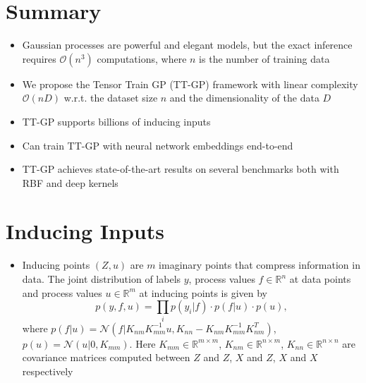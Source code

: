 \documentclass[a0,portrait]{a0poster}
\newcommand{\Knn}{K_{nn}}
\newcommand{\Knm}{K_{nm}}
\newcommand{\Kmm}{K_{mm}}
\newcommand{\R}{\mathbb{R}}
\newcommand{\N}{\mathcal{N}}
\newcommand{\bigO}{\mathcal{O}}
\begin{document}
\vspace{1cm} %
\large


\begin{multicols}{2} %


%

\section*{\LARGE \color{NavyBlue}Summary}

\begin{itemize}
  \item Gaussian processes are powerful and elegant models, but the exact inference 
    requires $\bigO(n^3)$ computations, where $n$ is the number of training data
  \item We propose the Tensor Train GP (TT-GP) framework with 
    linear complexity  $\bigO(n D)$  w.r.t. the dataset size $n$ and the dimensionality of the data $D$
  \item TT-GP supports billions of inducing inputs
  \item Can train TT-GP with neural network embeddings end-to-end
  \item TT-GP achieves state-of-the-art results on several  benchmarks
    both with RBF and deep kernels
\end{itemize}

\section*{\LARGE \color{NavyBlue}Inducing Inputs}

\begin{itemize}
  \item Inducing points $(Z, u)$ are $m$ imaginary points that compress information in data.
    The joint distribution of labels $y$, process values $f \in \R^n$ at data points
    and process values $u \in \R^m$ at inducing points is given by
    \[
      p(y, f, u) = \prod_i p(y_i \vert f)\cdot p(f \vert u)\cdot p(u),
    \]
    where 
    $p(f | u) = \N(f | \Knm \Kmm^{-1} u, \Knn - \Knm \Kmm^{-1} \Knm^T)$,
    $p(u)= \N(u | 0, \Kmm)$. 
    Here $K_{mm} \in \R^{m \times m}$,
    $K_{nm} \in \R^{n \times m}$,
    $K_{nn} \in \R^{n \times n}$ are covariance matrices computed between $Z$ and $Z$,
    $X$ and $Z$, $X$ and $X$ respectively


\end{itemize}
\end{multicols}
\end{document}

